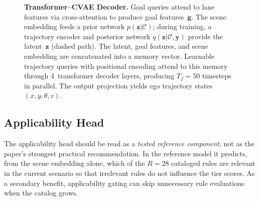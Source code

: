 \begin{figure}
{
}%
\caption{\textbf{Transformer--CVAE Decoder.}  Goal queries attend to lane features via cross-attention to produce goal features~$\mathbf{g}$.  The scene embedding feeds a prior network $p(\mathbf{z}|\mathcal{C})$; during training, a trajectory encoder and posterior network $q(\mathbf{z}|\mathcal{C}, \mathbf{y})$ provide the latent~$\mathbf{z}$ (dashed path).  The latent, goal features, and scene embedding are concatenated into a memory vector.  Learnable trajectory queries with positional encoding attend to this memory through 4~transformer decoder layers, producing $T_f{=}50$ timesteps in parallel.  The output projection yields ego trajectory states $(x, y, \theta, v)$.}
\label{fig:decoder}
\end{figure}

\subsection{Applicability Head}
\label{subsec:applicability_head}

The applicability head should be read as a \emph{tested reference component}, not as the paper's strongest practical recommendation.  In the reference model it predicts, from the scene embedding alone, which of the $R{=}28$ cataloged rules are relevant in the current scenario so that irrelevant rules do not influence the tier scores.  As a secondary benefit, applicability gating can skip unnecessary rule evaluations when the catalog grows.

